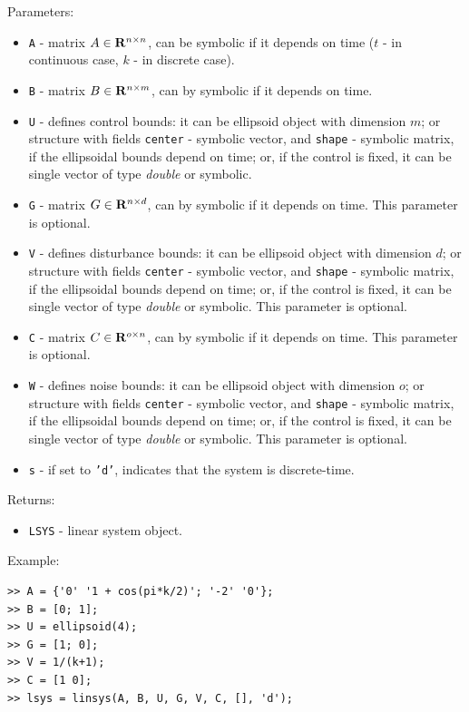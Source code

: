 \documentclass{report}
\begin{document}
Parameters:
\begin{itemize}
\item {\tt A} - matrix $A\in{\bf R}^{n\times n}$, can be symbolic if it
depends on time ($t$ - in continuous case, $k$ - in discrete case).
\item {\tt B} - matrix $B\in{\bf R}^{n\times m}$, can by symbolic if it
depends on time.
\item {\tt U} - defines control bounds: it can be ellipsoid object with
dimension $m$; or structure with fields {\tt center} - symbolic vector,
and {\tt shape} - symbolic matrix, if the ellipsoidal bounds depend on time;
or, if the control is fixed, it can be single vector of type {\it double}
or symbolic.
\item {\tt G} - matrix $G\in{\bf R}^{n\times d}$, can by symbolic if it
depends on time. This parameter is optional.
\item {\tt V} - defines disturbance bounds: it can be ellipsoid object with
dimension $d$; or structure with fields {\tt center} - symbolic vector,
and {\tt shape} - symbolic matrix, if the ellipsoidal bounds depend on time;
or, if the control is fixed, it can be single vector of type {\it double}
or symbolic. This parameter is optional.
\item {\tt C} - matrix $C\in{\bf R}^{o\times n}$, can by symbolic if it
depends on time. This parameter is optional.
\item {\tt W} - defines noise bounds: it can be ellipsoid object with
dimension $o$; or structure with fields {\tt center} - symbolic vector,
and {\tt shape} - symbolic matrix, if the ellipsoidal bounds depend on time;
or, if the control is fixed, it can be single vector of type {\it double}
or symbolic. This parameter is optional.
\item {\tt s} - if set to {\tt 'd'}, indicates that the system is discrete-time.
\end{itemize}

Returns:
\begin{itemize}
\item {\tt LSYS} - linear system object.
\end{itemize}

Example:
{\tt \begin{verbatim}
>> A = {'0' '1 + cos(pi*k/2)'; '-2' '0'};
>> B = [0; 1];
>> U = ellipsoid(4);
>> G = [1; 0];
>> V = 1/(k+1);
>> C = [1 0];
>> lsys = linsys(A, B, U, G, V, C, [], 'd');
\end{verbatim} }
\end{document}
